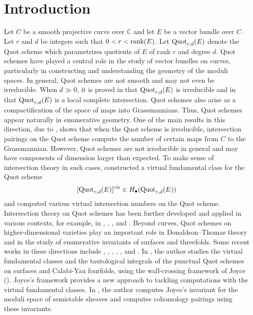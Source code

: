 \documentclass[11pt]{amsart}
\theoremstyle{remark}
\newcommand{\mb}[1]{\mathbb{#1}}
\newcommand{\rk}{\textnormal{rank}}
\newcommand{\quot}[0]{\textnormal{Quot}}
\newcommand{\vir}[0]{\textnormal{vir}}
\newcommand{\redc}[1]{\textcolor{red}{#1}}
\numberwithin{theorem}{section}
\begin{document}
    \section{Introduction}
    Let $C$ be a smooth projective curve over $\mb C$ and let $E$ be a vector bundle over $C$.
    Let $r$ and $d$ be integers such that $0 < r < \rk(E)$.
    Let $\quot_{r,d}(E)$ denote the Quot scheme which parametrizes quotients of $E$ of rank $r$ and degree $d$.
    Quot schemes have played a central role in the study of vector bundles on curves, particularly in constructing and understanding the geometry of the moduli spaces.
    In general, Quot schemes are not smooth and may not even be irreducible.
    When $d \gg 0$, it is proved in \cite{PR03} that $\quot_{r,d}(E)$
    is irreducible and in \cite{GS24}
    that $\quot_{r,d}(E)$ is a local complete intersection.
    Quot schemes also arise as a compactification of the space of maps into Grassmannians.
    Thus, Quot schemes appear naturally in enumerative geometry. 
    One of the main results in this direction, due to \cite{Ber94}, shows that when the Quot scheme is irreducible, intersection pairings on the Quot scheme compute the number of certain maps from $C$ to the Grassmannian.
    However, Quot schemes are not irreducible in general and may have components of dimension larger than expected. 
    To make sense of intersection theory in such cases, 
    \cite{MO07c} constructed a virtual fundamental class for the Quot scheme 
    $$[\quot_{r,d}(E)]^\vir \in H_\bullet(\quot_{r,d}(E))$$
    and computed various virtual intersection numbers on the Quot scheme.
    Intersection theory on Quot schemes has been further developed and applied in various contexts, for example, in \cite{MO10}, \cite{MO07a}, \cite{MO07b}, and \cite{Mar25}.
    Beyond curves, Quot schemes on higher-dimensional varieties play an important role in Donaldson–Thomas theory and in the study of enumerative invariants of surfaces and threefolds. Some recent works in these directions include \cite{OP21}, \cite{AJLOP}, \cite{Boj25}, \cite{Ric20}, \cite{SR21}, and \cite{FMR21}.
    In \cite{Boj25}, the author studies the virtual fundamental classes and the tautological integrals of the punctual Quot schemes on surfaces and Calabi-Yau fourfolds,
    using the wall-crossing framework of Joyce (\cite{Joy21}).
    Joyce's framework provides a new approach to tackling computations with the virtual fundamental classes.
    In \cite{Bu23}, the author computes Joyce's invariant for
    the moduli space of semistable sheaves and computes cohomology pairings using these invariants.
    
\end{document}
